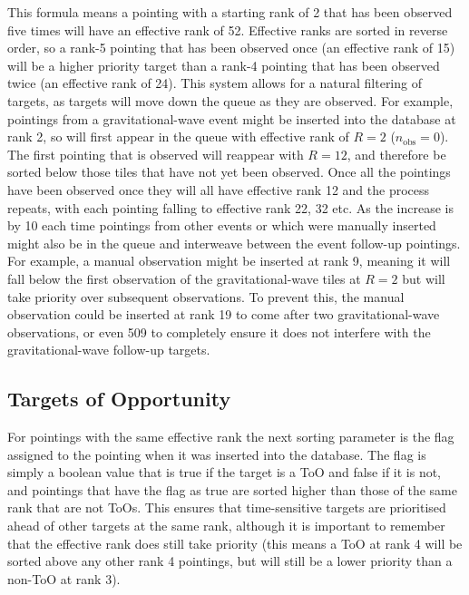 \begin{colsection}
This formula means a pointing with a starting rank of 2 that has been observed five times will have an effective rank of 52. Effective ranks are sorted in reverse order, so a rank-5 pointing that has been observed once (an effective rank of 15) will be a higher priority target than a rank-4 pointing that has been observed twice (an effective rank of 24). This system allows for a natural filtering of targets, as targets will move down the queue as they are observed. For example, pointings from a gravitational-wave event might be inserted into the database at rank 2, so will first appear in the queue with effective rank of $R=2$ ($n_\text{obs}=0$). The first pointing that is observed will reappear with $R=12$, and therefore be sorted below those tiles that have not yet been observed. Once all the pointings have been observed once they will all have effective rank 12 and the process repeats, with each pointing falling to effective rank 22, 32 etc. As the increase is by 10 each time pointings from other events or which were manually inserted might also be in the queue and interweave between the event follow-up pointings. For example, a manual observation might be inserted at rank 9, meaning it will fall below the first observation of the gravitational-wave tiles at $R=2$ but will take priority over subsequent observations. To prevent this, the manual observation could be inserted at rank 19 to come after two gravitational-wave observations, or even 509 to completely ensure it does not interfere with the gravitational-wave follow-up targets.

\end{colsection}


\subsection{Targets of Opportunity}
\label{sec:toos}
\begin{colsection}

For pointings with the same effective rank the next sorting parameter is the  flag assigned to the pointing when it was inserted into the database. The flag is simply a boolean value that is true if the target is a ToO and false if it is not, and pointings that have the flag as true are sorted higher than those of the same rank that are not ToOs. This ensures that time-sensitive targets are prioritised ahead of other targets at the same rank, although it is important to remember that the effective rank does still take priority (this means a ToO at rank 4 will be sorted above any other rank 4 pointings, but will still be a lower priority than a non-ToO at rank 3).

\end{colsection}

